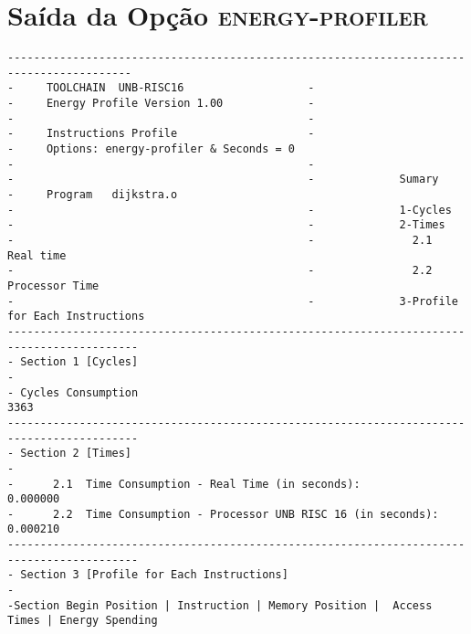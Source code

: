 \section{Saída da Opção \textsc{energy-profiler}}
\scriptsize
\begin{verbatim}
-----------------------------------------------------------------------------------------
-     TOOLCHAIN  UNB-RISC16                   -                                          
-     Energy Profile Version 1.00             -                                            
-                                             -                                            
-     Instructions Profile                    -                                            
-     Options: energy-profiler & Seconds = 0       
-                                             -                                            
-                                             -             Sumary                       
-     Program   dijkstra.o
-                                             -             1-Cycles                     
-                                             -             2-Times                      
-                                             -               2.1    Real time           
-                                             -               2.2    Processor Time      
-                                             -             3-Profile for Each Instructions
------------------------------------------------------------------------------------------
- Section 1 [Cycles]                                                                      
-                                                                                         
- Cycles Consumption                                                   3363                 
------------------------------------------------------------------------------------------
- Section 2 [Times]                                                                       
-                                                                                         
-      2.1  Time Consumption - Real Time (in seconds):                 0.000000                 
-      2.2  Time Consumption - Processor UNB RISC 16 (in seconds):     0.000210                 
------------------------------------------------------------------------------------------
- Section 3 [Profile for Each Instructions]                                               
-                                                                                         
-Section Begin Position | Instruction | Memory Position |  Access Times | Energy Spending


\end{verbatim}
